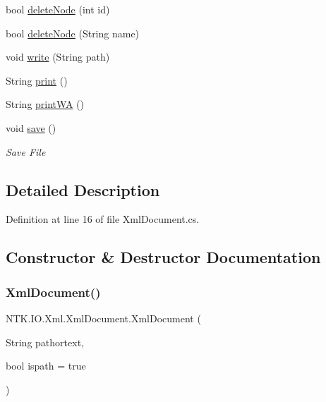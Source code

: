 \begin{DoxyCompactItemize}
\item 
bool \mbox{\hyperlink{class_n_t_k_1_1_i_o_1_1_xml_1_1_xml_document_a43911ac872f0c78ecd3833005a447f0e}{delete\+Node}} (int id)
\item 
bool \mbox{\hyperlink{class_n_t_k_1_1_i_o_1_1_xml_1_1_xml_document_af7aa3ff3944180a37e1f4ff94782dab8}{delete\+Node}} (String name)
\item 
void \mbox{\hyperlink{class_n_t_k_1_1_i_o_1_1_xml_1_1_xml_document_acdb9149537bb31116fb9a4273d257f8c}{write}} (String path)
\item 
String \mbox{\hyperlink{class_n_t_k_1_1_i_o_1_1_xml_1_1_xml_document_a792b1652215b4c10a8a3fd7e551ffcac}{print}} ()
\item 
String \mbox{\hyperlink{class_n_t_k_1_1_i_o_1_1_xml_1_1_xml_document_ae61f33ee823d20bee7c23f63693c20f6}{print\+WA}} ()
\item 
void \mbox{\hyperlink{class_n_t_k_1_1_i_o_1_1_xml_1_1_xml_document_a9493c21c61fbe32f2d90f10aa6c0e171}{save}} ()
\begin{DoxyCompactList}\small\item\em Save File \end{DoxyCompactList}\end{DoxyCompactItemize}


\subsection{Detailed Description}




Definition at line 16 of file Xml\+Document.\+cs.



\subsection{Constructor \& Destructor Documentation}
\mbox{\label{class_n_t_k_1_1_i_o_1_1_xml_1_1_xml_document_a87e102a1dd9f36c78376b7d9a1af94c0}} 
\subsubsection{\texorpdfstring{XmlDocument()}{XmlDocument()}\hspace{0.1cm}{\footnotesize\ttfamily [1/2]}}
{\footnotesize\ttfamily N\+T\+K.\+I\+O.\+Xml.\+Xml\+Document.\+Xml\+Document (\begin{DoxyParamCaption}\item[{String}]{pathortext,  }\item[{bool}]{ispath = {\ttfamily true} }\end{DoxyParamCaption})}






